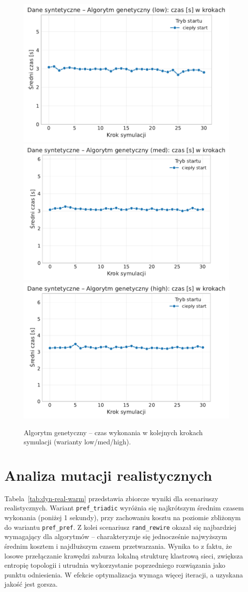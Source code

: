 \begin{figure}[H]
  \centering
  \includegraphics[width=0.32\linewidth]{assets/figures/dynamic/synthetic/synthetic_algorytm_genetyczny_time_over_steps_low.pdf}
  \includegraphics[width=0.32\linewidth]{assets/figures/dynamic/synthetic/synthetic_algorytm_genetyczny_time_over_steps_med.pdf}
  \includegraphics[width=0.32\linewidth]{assets/figures/dynamic/synthetic/synthetic_algorytm_genetyczny_time_over_steps_high.pdf}
  \caption{Algorytm genetyczny -- czas wykonania w kolejnych krokach symulacji (warianty low/med/high).}
  \label{fig:dyn-synth-genetic-time}
\end{figure}

\section{Analiza mutacji realistycznych}
Tabela~\ref{tab:dyn-real-warm} przedstawia zbiorcze wyniki dla scenariuszy realistycznych. Wariant \texttt{pref\_triadic} wyróżnia się najkrótszym średnim czasem wykonania (poniżej 1 sekundy), przy zachowaniu kosztu na poziomie zbliżonym do wariantu \texttt{pref\_pref}. Z kolei scenariusz \texttt{rand\_rewire} okazał się najbardziej wymagający dla algorytmów -- charakteryzuje się jednocześnie najwyższym średnim kosztem i najdłuższym czasem przetwarzania. Wynika to z faktu, że losowe przełączanie krawędzi zaburza lokalną strukturę klastrową sieci, zwiększa entropię topologii i utrudnia wykorzystanie poprzedniego rozwiązania jako punktu odniesienia. W efekcie optymalizacja wymaga więcej iteracji, a uzyskana jakość jest gorsza.


